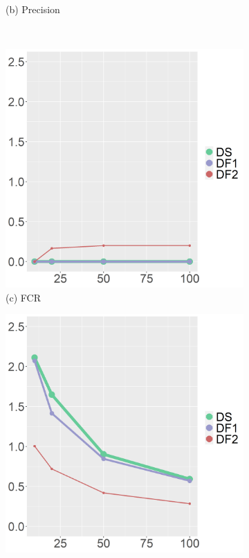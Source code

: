 \begin{figure}[ht!]
\begin{subfigure}[b]{.32\columnwidth}
    \caption{(b) Precision}
\end{subfigure}
\\
\centering
\begin{subfigure}[b]{.32\columnwidth} 
    \includegraphics[width=\columnwidth]{../../plot/FCR_1_med.png}
    \caption{(c) FCR}
\end{subfigure}
\hfill
\centering
\begin{subfigure}[b]{.32\columnwidth} 
    \includegraphics[width=\columnwidth]{../../plot/len_1_med.png}

\end{subfigure}
\end{figure}
